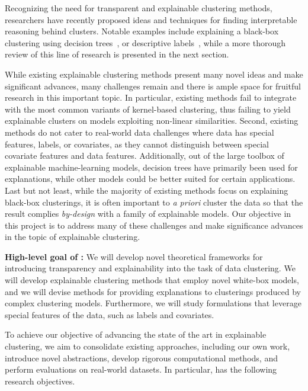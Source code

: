 \documentclass[a4paper,11pt]{article}
\begin{document}
Recognizing the need for transparent and explainable clustering methods, 
researchers have recently proposed ideas and techniques for finding 
interpretable reasoning behind clusters.
Notable examples include 
explaining a black-box clustering using decision trees~\cite{gupta2023price,moshkovitz2020explainable},
or descriptive labels~\cite{davidson2018cluster,sambaturu2020efficient}, 
while a more thorough review of this line of research is presented in the next section.

While existing explainable clustering methods present many novel ideas and make significant advances, 
many challenges remain and there is ample space for fruitful research in this important topic. 
In particular, existing methods fail to integrate with the most common variants of kernel-based clustering, 
thus failing to yield explainable clusters on models exploiting non-linear similarities.
Second, existing methods do not cater to real-world data challenges where data has special features, 
labels, or covariates, as they cannot distinguish between special covariate features and data features.
Additionally, out of the large toolbox of explainable machine-learning models,
decision trees have primarily been used for explanations, 
while other models could be better suited for certain applications. 
Last but not least, while the majority of existing methods focus on explaining black-box clusterings, 
it is often important to \emph{a priori} cluster the data so that the result complies 
\emph{by-design} with a family of explainable models.
Our objective in this project is to address many of these challenges
and make significance advances in the topic of explainable clustering.

\medskip
\noindent
\hspace{-3mm}\colorbox{verylightmagenta}{
\begin{minipage}{\textwidth}
{\bf High-level goal of \acronym:} 
We will develop novel theoretical frameworks for 
introducing transparency and explainability into the task of data clustering. 
We will develop explainable clustering methods that employ novel white-box models, 
and we will devise methods for providing explanations to clusterings produced by complex clustering models.
Furthermore, we will study formulations that leverage special features of the data,
such as labels and covariates.
\end{minipage}}

To achieve our objective of advancing the state of the art in explainable clustering,
we aim to consolidate existing approaches, including our own work,  
introduce novel abstractions, 
develop rigorous computational methods, and 
perform evaluations on real-world datasets.
In particular, {\acronym} has the following research objectives. 
\end{document}
